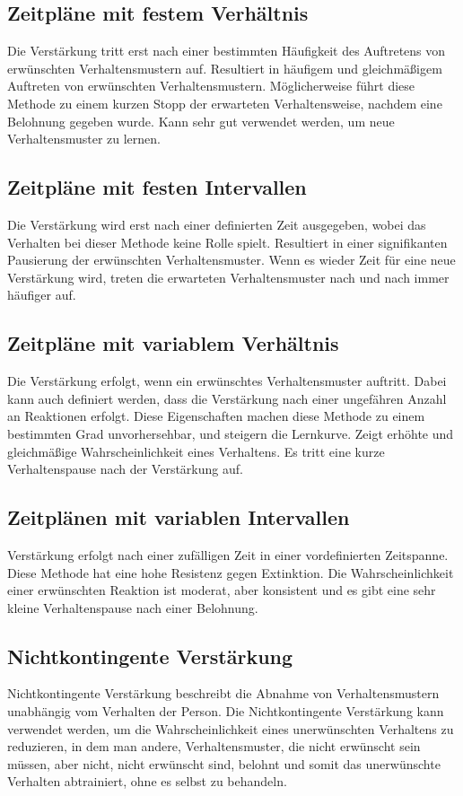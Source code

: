 \subsection{Zeitpläne mit festem Verhältnis}	
Die Verstärkung tritt erst nach einer bestimmten Häufigkeit des Auftretens von erwünschten Verhaltensmustern auf.
Resultiert in häufigem und gleichmäßigem Auftreten von erwünschten Verhaltensmustern. Möglicherweise führt diese Methode zu einem kurzen Stopp der erwarteten Verhaltensweise, nachdem eine Belohnung gegeben wurde. 
Kann sehr gut verwendet werden, um neue Verhaltensmuster zu lernen.
\subsection{Zeitpläne mit festen Intervallen}
Die Verstärkung wird erst nach einer definierten Zeit ausgegeben, wobei das Verhalten bei dieser Methode keine Rolle spielt. 
Resultiert in einer signifikanten Pausierung der erwünschten Verhaltensmuster. Wenn es wieder Zeit für eine neue Verstärkung wird, treten die erwarteten Verhaltensmuster nach und nach immer häufiger auf. 
\subsection{Zeitpläne mit variablem Verhältnis}
		Die Verstärkung erfolgt, wenn ein erwünschtes Verhaltensmuster auftritt. Dabei kann auch definiert werden, dass die Verstärkung nach einer ungefähren Anzahl an Reaktionen erfolgt. Diese Eigenschaften machen diese Methode zu einem bestimmten Grad unvorhersehbar, und steigern die Lernkurve. 
Zeigt erhöhte und gleichmäßige Wahrscheinlichkeit eines Verhaltens. Es tritt eine kurze Verhaltenspause nach der Verstärkung auf. 
\subsection{Zeitplänen mit variablen Intervallen}
Verstärkung erfolgt nach einer zufälligen Zeit in einer vordefinierten Zeitspanne. 
Diese Methode hat eine hohe Resistenz gegen Extinktion. Die Wahrscheinlichkeit einer erwünschten Reaktion ist moderat, aber konsistent und es gibt eine sehr kleine Verhaltenspause nach einer Belohnung. 
\subsection{Nichtkontingente Verstärkung}
Nichtkontingente Verstärkung beschreibt die Abnahme von Verhaltensmustern unabhängig vom Verhalten der Person. Die Nichtkontingente Verstärkung kann verwendet werden, um die Wahrscheinlichkeit eines unerwünschten Verhaltens zu reduzieren, in dem man andere, Verhaltensmuster, die nicht erwünscht sein müssen, aber nicht, nicht erwünscht sind, belohnt und somit das unerwünschte Verhalten abtrainiert, ohne es selbst zu behandeln. 
